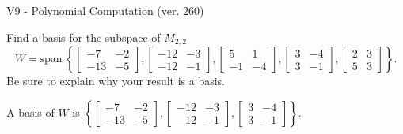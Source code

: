 \begin{exercise}
  \begin{exerciseTitle}V9 - Polynomial Computation (ver. 260)\end{exerciseTitle}
  \begin{exerciseStatement}
    Find a basis for the subspace of \(M_{2,2}\) 
\[W=\mathrm{span}\ \left\{\left[\begin{array}{cc}
-7 & -2 \\
-13 & -5
\end{array}\right] , \left[\begin{array}{cc}
-12 & -3 \\
-12 & -1
\end{array}\right] , \left[\begin{array}{cc}
5 & 1 \\
-1 & -4
\end{array}\right] , \left[\begin{array}{cc}
3 & -4 \\
3 & -1
\end{array}\right] , \left[\begin{array}{cc}
2 & 3 \\
5 & 3
\end{array}\right]\right\}.\]
 Be sure to explain why your result is a basis.


  \end{exerciseStatement}
  \begin{exerciseAnswer}
   A basis of \(W\) is  \(\left\{\left[\begin{array}{cc}
-7 & -2 \\
-13 & -5
\end{array}\right] , \left[\begin{array}{cc}
-12 & -3 \\
-12 & -1
\end{array}\right] , \left[\begin{array}{cc}
3 & -4 \\
3 & -1
\end{array}\right]\right\}\).
  


  \end{exerciseAnswer}
\end{exercise}